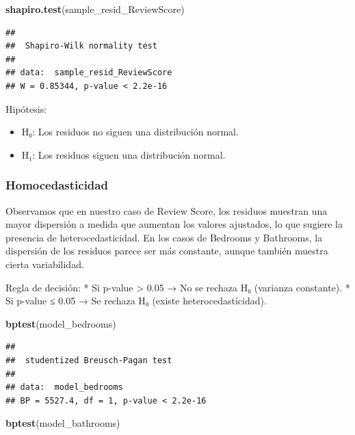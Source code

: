 \documentclass[
]{article}
\newenvironment{Shaded}{\begin{snugshade}}{\end{snugshade}}
\newcommand{\FunctionTok}[1]{\textcolor[rgb]{0.13,0.29,0.53}{\textbf{#1}}}
\newcommand{\NormalTok}[1]{#1}
\providecommand{\tightlist}{%
  \setlength{\itemsep}{0pt}\setlength{\parskip}{0pt}}
\begin{document}
\begin{Shaded}
\begin{Highlighting}[]
\FunctionTok{shapiro.test}\NormalTok{(sample\_resid\_ReviewScore)}
\end{Highlighting}
\end{Shaded}

\begin{verbatim}
## 
##  Shapiro-Wilk normality test
## 
## data:  sample_resid_ReviewScore
## W = 0.85344, p-value < 2.2e-16
\end{verbatim}

Hipótesis:

\begin{itemize}
\tightlist
\item
  H₀: Los residuos no siguen una distribución normal.
\item
  H₁: Los residuos siguen una distribución normal.
\end{itemize}

\subsubsection{Homocedasticidad}\label{homocedasticidad}

Observamos que en nuestro caso de Review Score, los residuos muestran
una mayor dispersión a medida que aumentan los valores ajustados, lo que
sugiere la presencia de heterocedasticidad. En los casos de Bedrooms y
Bathrooms, la dispersión de los residuos parece ser más constante,
aunque también muestra cierta variabilidad.

Regla de decisión: * Si p-value \textgreater{} 0.05 → No se rechaza H₀
(varianza constante). * Si p-value ≤ 0.05 → Se rechaza H₀ (existe
heterocedasticidad).

\begin{Shaded}
\begin{Highlighting}[]
\FunctionTok{bptest}\NormalTok{(model\_bedrooms)}
\end{Highlighting}
\end{Shaded}

\begin{verbatim}
## 
##  studentized Breusch-Pagan test
## 
## data:  model_bedrooms
## BP = 5527.4, df = 1, p-value < 2.2e-16
\end{verbatim}

\begin{Shaded}
\begin{Highlighting}[]
\FunctionTok{bptest}\NormalTok{(model\_bathrooms)}
\end{Highlighting}
\end{Shaded}
\end{document}
